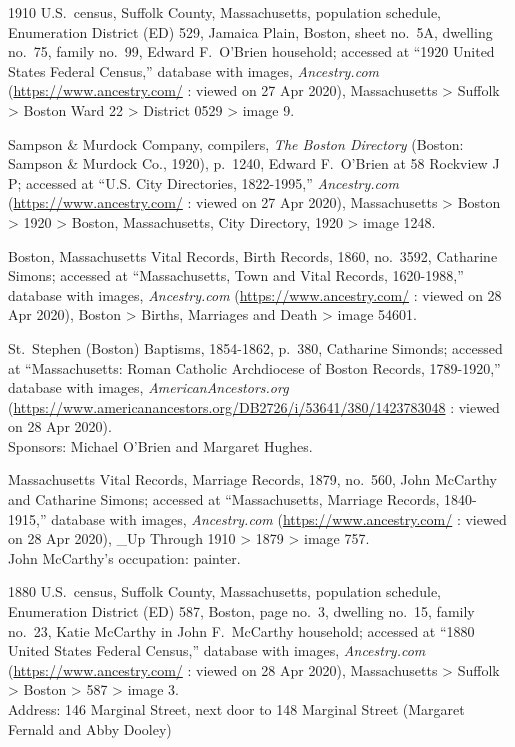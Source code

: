 \begin{thebibliography}{999}
	1910 U.S.\ census, Suffolk County, Massachusetts, population schedule, Enumeration District (ED) 529, Jamaica Plain, Boston, sheet no.\ 5A, dwelling no.\ 75, family no.\ 99, Edward F.\ O'Brien household; accessed at ``1920 United States Federal Census,'' database with images, \textit{Ancestry.com} (\url{https://www.ancestry.com/} : viewed on 27 Apr 2020), Massachusetts > Suffolk > Boston Ward 22 > District 0529 > image 9.
	
	Sampson \& Murdock Company, compilers, \textit{The Boston Directory} (Boston: Sampson \& Murdock Co., 1920), p.\ 1240, Edward F.\ O'Brien at 58 Rockview J P; accessed at ``U.S. City Directories, 1822-1995,'' \textit{Ancestry.com} (\url{https://www.ancestry.com/} : viewed on 27 Apr 2020), Massachusetts > Boston > 1920 > Boston, Massachusetts, City Directory, 1920 > image 1248.
	
	Boston, Massachusetts Vital Records, Birth Records, 1860, no.\ 3592, Catharine Simons; accessed at ``Massachusetts, Town and Vital Records, 1620-1988,'' database with images, \textit{Ancestry.com} (\url{https://www.ancestry.com/} : viewed on 28 Apr 2020), Boston > Births, Marriages and Death > image 54601.
	
	St.\ Stephen (Boston) Baptisms, 1854-1862, p.\ 380, Catharine Simonds; accessed at ``Massachusetts: Roman Catholic Archdiocese of Boston Records, 1789-1920,'' database with images, \textit{AmericanAncestors.org} (\url{https://www.americanancestors.org/DB2726/i/53641/380/1423783048} : viewed on 28 Apr 2020).\\
	Sponsors: Michael O'Brien and Margaret Hughes.
	
	Massachusetts Vital Records, Marriage Records, 1879, no.\ 560, John McCarthy and Catharine Simons; accessed at ``Massachusetts, Marriage Records, 1840-1915,'' database with images, \textit{Ancestry.com} (\url{https://www.ancestry.com/} : viewed on 28 Apr 2020), \_Up Through 1910 > 1879 > image 757.\\
	John McCarthy's occupation: painter.
	
	1880 U.S.\ census, Suffolk County, Massachusetts, population schedule, Enumeration District (ED) 587, Boston, page no.\ 3, dwelling no.\ 15, family no.\ 23, Katie McCarthy in John F.\ McCarthy household; accessed at ``1880 United States Federal Census,'' database with images, \textit{Ancestry.com} (\url{https://www.ancestry.com/} : viewed on 28 Apr 2020), Massachusetts > Suffolk > Boston > 587 > image 3.\\
	Address: 146 Marginal Street, next door to 148 Marginal Street (Margaret Fernald and Abby Dooley)
	

\end{thebibliography}
